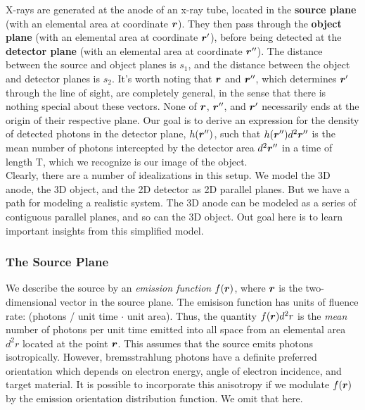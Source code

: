 \documentclass[mphy386-notes.tex]{subfiles}
\begin{document}

X-rays are generated at the anode of an x-ray tube, located in the
\textbf{source plane} (with an elemental area at coordinate $\boldsymbol{r}$). They then pass through the
\textbf{object plane} (with an elemental area at coordinate $\boldsymbol{r}'$), before
being detected at the \textbf{detector plane} (with an elemental area at coordinate $\boldsymbol{r}''$).
The distance between the source and object planes is $s_1$, and the distance
between the object and detector planes is $s_2$. It's worth noting that
$\boldsymbol{r}$ and $\boldsymbol{r}''$, which determines $\boldsymbol{r}'$ through the line of sight,  are completely general, in
the sense that there is nothing special about these vectors.  None of $\boldsymbol{r}$, $\boldsymbol{r}''$, and 
$\boldsymbol{r}'$ necessarily ends at the origin of their respective plane.  Our goal is to derive an expression for 
the density of detected photons in the detector plane, $h(\boldsymbol{r}'')$, such that $h(\boldsymbol{r}'')d^2\boldsymbol{r}''$ is the mean
number of photons intercepted by the detector area $d^2\boldsymbol{r}''$ in a time of length T, which 
we recognize is our image of the object. \\

Clearly, there are a number of idealizations in this setup. We model 
the 3D anode, the 3D object, and the 2D detector as 2D parallel planes. 
But we have a path for modeling a realistic system.  The 3D anode can be
modeled as a series of contiguous parallel planes, and so can the 3D object.  
Out goal here is to learn important insights from this simplified model.

\subsubsection{The Source Plane}

We describe the source by an \textit{emission function} $f(\boldsymbol{r})$, where
$\boldsymbol{r}$ is the two-dimensional vector in the source plane. The emisison
function has units of fluence rate: (photons / unit time $\cdot$ unit
area). Thus, the quantity $f(\boldsymbol{r})d^2 r$ is the \textit{mean} number of
photons per unit time emitted into all space from an elemental area $d^2 r$
located at the point $\boldsymbol{r}$. This assumes that
the source emits photons isotropically. However, bremsstrahlung photons have
a definite preferred orientation which depends on electron energy, angle of
electron incidence, and target material.  It is possible to incorporate this 
anisotropy if we modulate $f(\boldsymbol{r})$ by the emission orientation
distribution function.  We omit that here.
\end{document}
